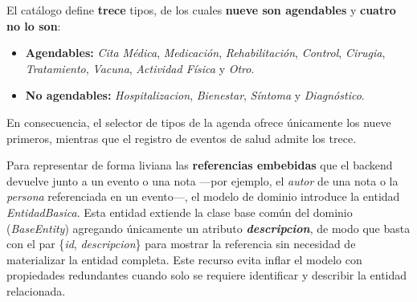 \documentclass[a4paper,12pt]{article}
\begin{document}
    \par El catálogo define \textbf{trece} tipos, de los cuales \textbf{nueve son agendables} y \textbf{cuatro no lo son}:
    \begin{itemize}
        \item \textbf{Agendables:} \textit{Cita Médica}, \textit{Medicación}, \textit{Rehabilitación}, \textit{Control}, \textit{Cirugia}, \textit{Tratamiento}, \textit{Vacuna}, \textit{Actividad Física} y \textit{Otro}.
        \item \textbf{No agendables:} \textit{Hospitalizacion}, \textit{Bienestar}, \textit{Síntoma} y \textit{Diagnóstico}.
    \end{itemize}
    \par En consecuencia, el selector de tipos de la agenda ofrece únicamente los nueve primeros, mientras que el registro de eventos de salud admite los trece.
    \par Para representar de forma liviana las \textbf{referencias embebidas} que el backend devuelve junto a un evento o una nota —por ejemplo, el \textit{autor} de una nota o la \textit{persona} referenciada en un evento—, el modelo de dominio introduce la entidad \textit{EntidadBasica}. Esta entidad extiende la clase base común del dominio (\textit{BaseEntity}) agregando únicamente un atributo \textbf{\textit{descripcion}}, de modo que basta con el par \{\textit{id}, \textit{descripcion}\} para mostrar la referencia sin necesidad de materializar la entidad completa. Este recurso evita inflar el modelo con propiedades redundantes cuando solo se requiere identificar y describir la entidad relacionada.
\end{document}
